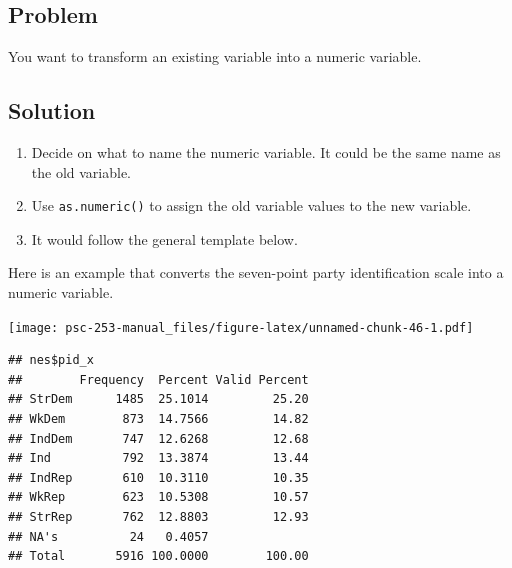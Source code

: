 \documentclass[
]{book}
\newenvironment{Shaded}{\begin{snugshade}}{\end{snugshade}}
\newcommand{\CommentTok}[1]{\textcolor[rgb]{0.56,0.35,0.01}{\textit{#1}}}
\newcommand{\FunctionTok}[1]{\textcolor[rgb]{0.00,0.00,0.00}{#1}}
\newcommand{\NormalTok}[1]{#1}
\newcommand{\OtherTok}[1]{\textcolor[rgb]{0.56,0.35,0.01}{#1}}
\newcommand{\SpecialCharTok}[1]{\textcolor[rgb]{0.00,0.00,0.00}{#1}}
\providecommand{\tightlist}{%
  \setlength{\itemsep}{0pt}\setlength{\parskip}{0pt}}
\begin{document}
\hypertarget{problem-18}{%
\subsection{Problem}\label{problem-18}}

You want to transform an existing variable into a numeric variable.

\hypertarget{solution-18}{%
\subsection{Solution}\label{solution-18}}

\begin{enumerate}
\def\labelenumi{\arabic{enumi}.}
\tightlist
\item
  Decide on what to name the numeric variable. It could be the same name as the old variable.
\item
  Use \texttt{as.numeric()} to assign the old variable values to the new variable.
\item
  It would follow the general template below.
\end{enumerate}

\begin{Shaded}
\end{Shaded}

Here is an example that converts the seven-point party identification scale into a numeric variable.

\begin{Shaded}
\end{Shaded}

\texttt{[image: psc-253-manual\_files/figure-latex/unnamed-chunk-46-1.pdf]}

\begin{verbatim}
## nes$pid_x 
##        Frequency  Percent Valid Percent
## StrDem      1485  25.1014         25.20
## WkDem        873  14.7566         14.82
## IndDem       747  12.6268         12.68
## Ind          792  13.3874         13.44
## IndRep       610  10.3110         10.35
## WkRep        623  10.5308         10.57
## StrRep       762  12.8803         12.93
## NA's          24   0.4057              
## Total       5916 100.0000        100.00
\end{verbatim}
\end{document}
